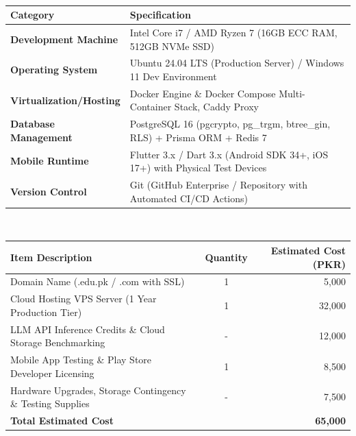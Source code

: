 \documentclass[12pt,a4paper]{article}
\begin{document}
\newpage
{}\\[8pt]
\begin{table}[h]
\centering
\small
\begin{tabularx}{\textwidth}{lX}
\toprule
\textbf{Category} & \textbf{Specification} \\
\midrule
\textbf{Development Machine} & Intel Core i7 / AMD Ryzen 7 (16GB ECC RAM, 512GB NVMe SSD) \\
\textbf{Operating System} & Ubuntu 24.04 LTS (Production Server) / Windows 11 Dev Environment \\
\textbf{Virtualization/Hosting} & Docker Engine \& Docker Compose Multi-Container Stack, Caddy Proxy \\
\textbf{Database Management} & PostgreSQL 16 (pgcrypto, pg\_trgm, btree\_gin, RLS) + Prisma ORM + Redis 7 \\
\textbf{Mobile Runtime} & Flutter 3.x / Dart 3.x (Android SDK 34+, iOS 17+) with Physical Test Devices \\
\textbf{Version Control} & Git (GitHub Enterprise / Repository with Automated CI/CD Actions) \\
\bottomrule
\end{tabularx}
\end{table}

\\[8pt]
\begin{table}[h]
\centering
\small
\begin{tabularx}{\textwidth}{Xcr}
\toprule
\textbf{Item Description} & \textbf{Quantity} & \textbf{Estimated Cost (PKR)} \\
\midrule
Domain Name (.edu.pk / .com with SSL) & 1 & 5,000 \\
Cloud Hosting VPS Server (1 Year Production Tier) & 1 & 32,000 \\
LLM API Inference Credits \& Cloud Storage Benchmarking & - & 12,000 \\
Mobile App Testing \& Play Store Developer Licensing & 1 & 8,500 \\
Hardware Upgrades, Storage Contingency \& Testing Supplies & - & 7,500 \\
\midrule
\textbf{Total Estimated Cost} & & \textbf{65,000} \\
\bottomrule
\end{tabularx}
\end{table}
\end{document}
